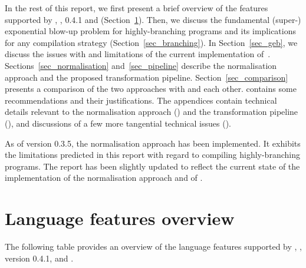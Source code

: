 \documentclass[
    9pt,            %
    techreport,        %
    affiltop,       %
]{art}
\begin{document}
In the rest of this report, we first present a brief overview of the
features supported by \Juvix{}, \JuvixCore{}, \Geb{} 0.4.1 and
\VampIR{} (Section~\ref{sec_features}). Then, we discuss the fundamental
(super-) exponential blow-up problem for highly-branching programs and
its implications for any compilation strategy
(Section~\ref{sec_branching}). In Section~\ref{sec_geb}, we discuss the
issues with and limitations of the current implementation
of~\Geb{}. Sections~\ref{sec_normalisation} and~\ref{sec_pipeline}
describe the normalisation approach and the proposed transformation
pipeline. Section~\ref{sec_comparison} presents a comparison of the
two approaches with \Geb{} and each other. 
contains some recommendations and their justifications. The
appendices contain technical details relevant to the normalisation
approach () and the transformation
pipeline (), and discussions of a
few more tangential technical issues ().

\begin{remark}[Update] As of \Juvix{} version 0.3.5, the normalisation approach
has been implemented. It exhibits the limitations predicted in this
report with regard to compiling highly-branching programs. The report
has been slightly updated to reflect the current state of the
implementation of the normalisation approach and of \Geb{}.
\end{remark}

\section{Language features overview}\label{sec_features}

The following table provides an overview of the language features
supported by \Juvix{}, \JuvixCore{}, \Geb{} version 0.4.1, and \VampIR{}.
\end{document}
